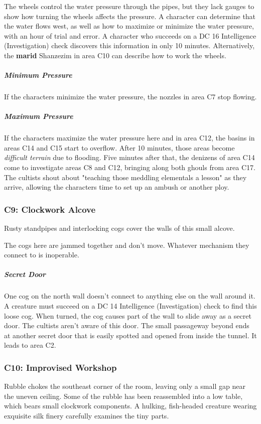 \documentclass[10pt,a4paper,twoside,bg=print,twocolumn,openany,nodeprecatedcode]{dndbook}
\begin{document}
The wheels control the water pressure through the pipes, but they lack gauges to show how turning the wheels affects the pressure. A character can determine that the water flows west, as well as how to maximize or minimize the water pressure, with an hour of trial and error. A character who succeeds on a DC 16 Intelligence (Investigation) check discovers this information in only 10 minutes. Alternatively, the \textbf{marid} Shanzezim in area C10 can describe how to work the wheels.

\subparagraph{Minimum Pressure}
If the characters minimize the water pressure, the nozzles in area C7 stop flowing.

\subparagraph{Maximum Pressure}
If the characters maximize the water pressure here and in area C12, the basins in areas C14 and C15 start to overflow. After 10 minutes, those areas become \textit{difficult terrain} due to flooding. Five minutes after that, the denizens of area C14 come to investigate areas C8 and C12, bringing along both ghouls from area C17. The cultists shout about "teaching those meddling elementals a lesson" as they arrive, allowing the characters time to set up an ambush or another ploy.

\subsubsection{C9: Clockwork Alcove}
\begin{DndReadAloud}{}
Rusty standpipes and interlocking cogs cover the walls of this small alcove.

\end{DndReadAloud}

The cogs here are jammed together and don't move. Whatever mechanism they connect to is inoperable.

\subparagraph{Secret Door}
One cog on the north wall doesn't connect to anything else on the wall around it. A creature must succeed on a DC 14 Intelligence (Investigation) check to find this loose cog. When turned, the cog causes part of the wall to slide away as a secret door. The cultists aren't aware of this door. The small passageway beyond ends at another secret door that is easily spotted and opened from inside the tunnel. It leads to area C2.

\subsubsection{C10: Improvised Workshop}
\begin{DndReadAloud}{}
Rubble chokes the southeast corner of the room, leaving only a small gap near the uneven ceiling. Some of the rubble has been reassembled into a low table, which bears small clockwork components. A hulking, fish-headed creature wearing exquisite silk finery carefully examines the tiny parts.

\end{DndReadAloud}
\end{document}

